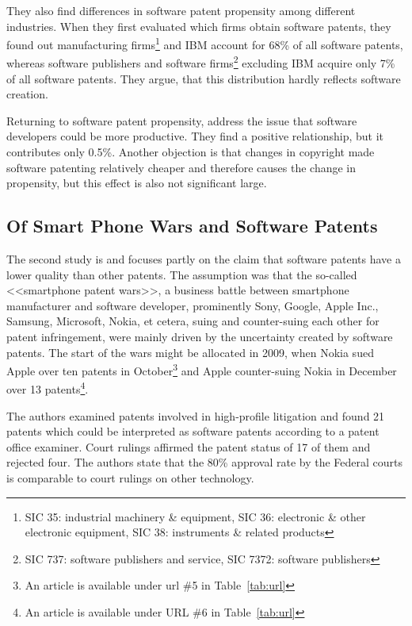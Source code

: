 \documentclass[12pt, a4paper]{scrartcl}
\theoremstyle{definition}
\begin{document}
They also find differences in software patent propensity among different
industries. When they first evaluated which firms obtain software patents, they
found out manufacturing firms\footnote{SIC 35: industrial machinery \&
equipment, SIC 36: electronic \& other electronic equipment, SIC 38:
instruments \& related products} and IBM account for 68\% of all software
patents, whereas software publishers and software firms\footnote{SIC 737:
software publishers and service, SIC 7372: software publishers} excluding IBM
acquire only 7\% of all software patents. They argue, that this distribution
hardly reflects software creation.

Returning to software patent propensity, \citeauthor{bessen2007empirical}
address the issue that software developers could be more productive. They find
a positive relationship, but it contributes only 0.5\%. Another objection is
that changes in copyright made software patenting relatively cheaper and
therefore causes the change in propensity, but this effect is also not
significant large.


\subsection{Of Smart Phone Wars and Software Patents} %
\label{sub:of_smart_phone_wars_and_software_patents}

The second study is \citet{graham2013smart} and focuses partly on the claim
that software patents have a lower quality than other patents. The assumption
was that the so-called <<smartphone patent wars>>, a business battle between
smartphone manufacturer and software developer, prominently Sony, Google, Apple
Inc., Samsung, Microsoft, Nokia, et cetera, suing and counter-suing each other
for patent infringement, were mainly driven by the uncertainty created by
software patents. The start of the wars might be allocated in 2009, when Nokia
sued Apple over ten patents in October\footnote{An article is available under
url \#5 in Table~\ref{tab:url}} and Apple counter-suing Nokia in December over
13 patents\footnote{An article is available under URL \#6 in
Table~\ref{tab:url}}.

The authors examined patents involved in high-profile litigation and found 21
patents which could be interpreted as software patents according to a patent
office examiner. Court rulings affirmed the patent status of 17 of them and
rejected four. The authors state that the 80\% approval rate by the Federal
courts is comparable to court rulings on other technology.
\end{document}

